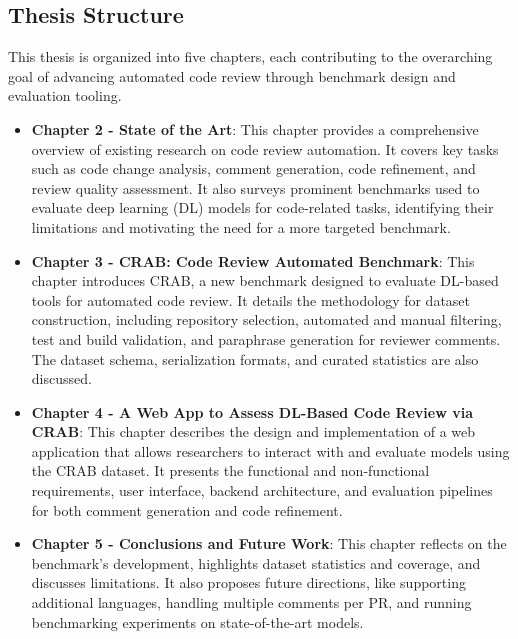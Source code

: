 \subsection{Thesis Structure}

This thesis is organized into five chapters, each contributing to the overarching goal of advancing
automated code review through benchmark design and evaluation tooling.

\begin{itemize}
	\item \textbf{Chapter 2 - State of the Art}: This chapter provides a comprehensive overview of
	      existing research on code review automation. It covers key tasks such as code change
	      analysis, comment generation, code refinement, and review quality assessment. It also
	      surveys prominent benchmarks used to evaluate deep learning (DL) models for code-related
	      tasks, identifying their limitations and motivating the need for a more targeted benchmark.

	\item \textbf{Chapter 3 - CRAB: Code Review Automated Benchmark}: This chapter introduces CRAB,
	      a new benchmark designed to evaluate DL-based tools for automated code review. It details
	      the methodology for dataset construction, including repository selection, automated and
	      manual filtering, test and build validation, and paraphrase generation for reviewer
	      comments. The dataset schema, serialization formats, and curated statistics are also
	      discussed.

	\item \textbf{Chapter 4 - A Web App to Assess DL-Based Code Review via CRAB}: This chapter
	      describes the design and implementation of a web application that allows researchers to
	      interact with and evaluate models using the CRAB dataset. It presents the functional and
	      non-functional requirements, user interface, backend architecture, and evaluation pipelines
	      for both comment generation and code refinement.


	\item \textbf{Chapter 5 - Conclusions and Future Work}: This chapter reflects on the benchmark’s
	      development, highlights dataset statistics and coverage, and discusses limitations. It also
	      proposes future directions, like supporting additional languages, handling multiple comments
	      per PR, and running benchmarking experiments on state-of-the-art models.
\end{itemize}
